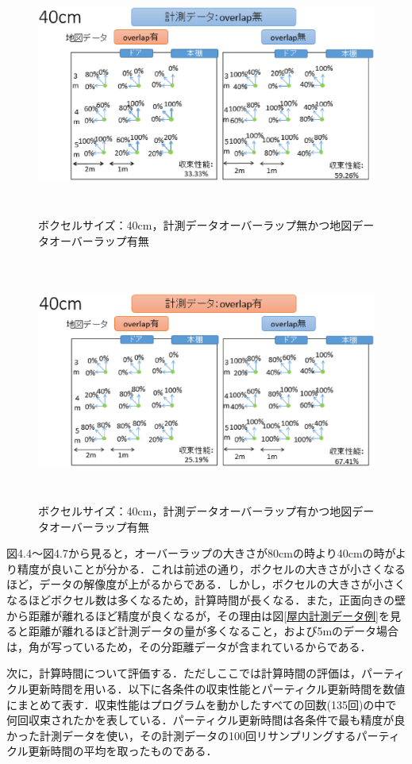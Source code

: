 %
\begin{figure}[htbp]
  \begin{center}
   \includegraphics[height=80mm]{figure/無有無2.eps}
   \caption{ボクセルサイズ：40cm，計測データオーバーラップ無かつ地図データオーバーラップ有無}
   \label{40-0}
  \end{center}
\end{figure}
%

%
\begin{figure}[htbp]
  \begin{center}
   \includegraphics[height=80mm]{figure/有有無2.eps}
   \caption{ボクセルサイズ：40cm，計測データオーバーラップ有かつ地図データオーバーラップ有無}
   \label{40-1}
  \end{center}
\end{figure}
%

\newpage
図4.4～図4.7から見ると，オーバーラップの大きさが80cmの時より40cmの時がより精度が良いことが分かる．これは前述の通り，ボクセルの大きさが小さくなるほど，データの解像度が上がるからである．しかし，ボクセルの大きさが小さくなるほどボクセル数は多くなるため，計算時間が長くなる．また，正面向きの壁から距離が離れるほど精度が良くなるが，その理由は図{\ref{屋内計測データ例}}を見ると距離が離れるほど計測データの量が多くなること，および5mのデータ場合は，角が写っているため，その分距離データが含まれているからである．\par
次に，計算時間について評価する．ただしここでは計算時間の評価は，パーティクル更新時間を用いる．以下に各条件の収束性能とパーティクル更新時間を数値にまとめて表す．収束性能はプログラムを動かしたすべての回数(135回)の中で何回収束されたかを表している．パーティクル更新時間は各条件で最も精度が良かった計測データを使い，その計測データの100回リサンプリングするパーティクル更新時間の平均を取ったものである．

